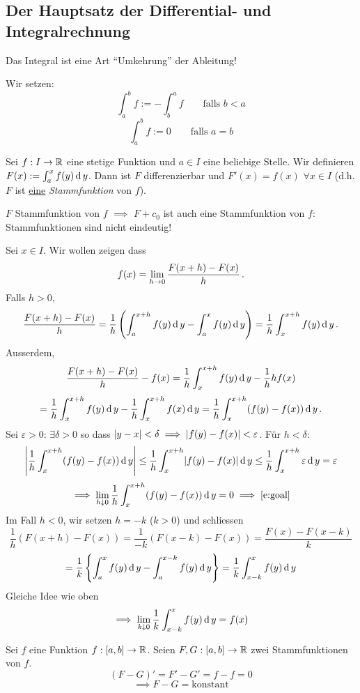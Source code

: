 \subsection{Der Hauptsatz der Differential- und Integralrechnung}
Das Integral ist eine Art ``Umkehrung'' der Ableitung!

\begin{Def} Wir setzen:
\[
\int_a^b f := - \int_b^a f \qquad \mbox{falls $b<a$}
\]
\[
\int_a^b f := 0 \qquad \mbox{falls $a=b$}
 \]
\end{Def}
\begin{theorem}
Sei $f:I\to\mathbb{R}$ eine stetige Funktion und $a\in I$ eine beliebige Stelle.
Wir definieren $F(x):=\int_a^xf(y)\operatorname{d} y$. Dann ist $F$ differenzierbar und 
$F'(x)=f(x)$ $\forall x\in I$ (d.h. $F$ ist \ul{eine} {\em Stammfunktion} von $f$).
\end{theorem}
\begin{Bem}
  $F$ Stammfunktion von $f$ $\implies$ $F+c_0$ ist auch eine Stammfunktion von $f$:
Stammfunktionen sind nicht eindeutig!
\end{Bem}
\begin{Bew} Sei $x\in I$. Wir wollen zeigen dass
\begin{equation}\label{e:goal}
f(x) = \displaystyle\lim_{h\rightarrow0}\frac{F(x+h)-F(x)}{h}\, .
\end{equation}
Falls $h>0$,
  \[\frac{F(x+h)-F(x)}{h}=\frac{1}{h}\left( \int_a^{x+h}f(y)\operatorname{d} y-\int_a^xf(y)\operatorname{d} y \right) =\frac{1}{h}\int_x^{x+h}f(y)\operatorname{d} y\, .\]
 Ausserdem,
  \[
\frac{F(x+h)-F(x)}{h}-f(x) = \frac{1}{h} \int_x^{x+h} f(y) \operatorname{d} y 
- \frac{1}{h} hf(x)
\]
\[
= \frac{1}{h} \int_x^{x+h} f(y)\operatorname{d} y - \frac{1}{h} \int_x^{x+h} f(x)\operatorname{d} y
= \frac{1}{h} \int_x^{x+h} (f(y)-f(x))\operatorname{d} y\, .
\]
Sei $\varepsilon>0$: $\exists \delta>0$ so dass 
$\mathopen| y-x \mathclose|<\delta\implies\mathopen| f(y)-f(x) \mathclose|<\varepsilon$. Für $h<\delta$:
\[\left|\frac{1}{h}\int_x^{x+h} (f(y)-f(x))\operatorname{d} y\right|
\leq \frac{1}{h}\int_x^{x+h}\mathopen| f(y)-f(x) \mathclose|\operatorname{d} y\leq 
\frac{1}{h}\int_x^{x+h}\varepsilon\operatorname{d} y = \varepsilon\]
\[\implies \lim_{h\downarrow 0}\frac{1}{h}\int_x^{x+h} (f(y)-f(x))\operatorname{d} y=0 \implies \eqref{e:goal}\]
Im Fall $h<0$, wir setzen $h=-k$ ($k>0$) und schliessen
  \[\frac{1}{h}(F(x+h)-F(x))=\frac{1}{-k}(F(x-k)-F(x))=\frac{F(x)-F(x-k)}{k}\]
  \[=\frac{1}{k}\left\{ \int_a^xf(y)\operatorname{d} y-\int_a^{x-k}f(y)\operatorname{d} y \right\}=\frac{1}{k}\int_{x-k}^xf(y)\operatorname{d} y\]
  Gleiche Idee wie oben
  \[\implies \lim_{k\downarrow 0}\frac{1}{k}\int_{x-k}^xf(y)\operatorname{d} y=f(x)\]
\end{Bew}
\begin{Bem}
  Sei $f$ eine Funktion $f:[a,b]\to\mathbb{R}$. Seien $F,G:[a,b]\to \mathbb{R}$ zwei Stammfunktionen von $f$.
  \[(F-G)'=F'-G'=f-f=0\]
  \[\implies F-G=\text{konstant}\]
\end{Bem}
